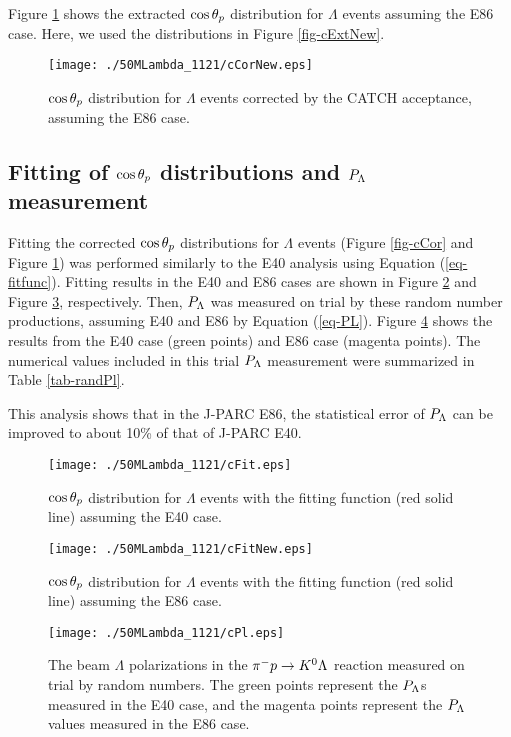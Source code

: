 Figure \ref{fig-cCorNew} shows the extracted $\cos{\theta_p}$ distribution for $\Lambda$ events assuming the E86 case. Here, we used the distributions in Figure \ref{fig-cExtNew}. 

\begin{figure}[h]
  \centering
  \texttt{[image: ./50MLambda\_1121/cCorNew.eps]}
  \caption{$\cos{\theta_p}$ distribution for $\Lambda$ events corrected by the CATCH acceptance, assuming the E86 case.}
  \label{fig-cCorNew}
\end{figure}


\subsection{Fitting of $\cos{\theta_p}$ distributions and $P_{\Lambda}$ measurement}
\label{subsec-randfit}

Fitting the corrected $\cos{\theta_p}$ distributions for $\Lambda$ events (Figure \ref{fig-cCor} and Figure \ref{fig-cCorNew}) was performed similarly to the E40 analysis using Equation (\ref{eq-fitfunc}). Fitting results in the E40 and E86 cases are shown in Figure \ref{fig-cFit} and Figure \ref{fig-cFitNew}, respectively. Then, $P_{\Lambda}$ was measured on trial by these random number productions, assuming E40 and E86 by Equation (\ref{eq-PL}). Figure \ref{fig-cPl} shows the results from the E40 case (green points) and E86 case (magenta points). The numerical values included in this trial $P_{\Lambda}$ measurement were summarized in Table \ref{tab-randPl}.

This analysis shows that in the J-PARC E86, the statistical error of $P_{\Lambda}$ can be improved to about 10\% of that of J-PARC E40.

\begin{figure}[h]
  \centering
  \texttt{[image: ./50MLambda\_1121/cFit.eps]}
  \caption{$\cos{\theta_p}$ distribution for $\Lambda$ events with the fitting function (red solid line) assuming the E40 case.}
  \label{fig-cFit}
\end{figure}

\begin{figure}[h]
  \centering
  \texttt{[image: ./50MLambda\_1121/cFitNew.eps]}
  \caption{$\cos{\theta_p}$ distribution for $\Lambda$ events with the fitting function (red solid line) assuming the E86 case.}
  \label{fig-cFitNew}
\end{figure}

\begin{figure}[h]
  \centering
  \texttt{[image: ./50MLambda\_1121/cPl.eps]}
  \caption{The beam $\Lambda$ polarizations in the $\pi^- p \to K^0 \Lambda$ reaction measured on trial by random numbers. The green points represent the $P_{\Lambda}$s measured in the E40 case, and the magenta points represent the $P_{\Lambda}$ values measured in the E86 case.}
  \label{fig-cPl}
\end{figure}

